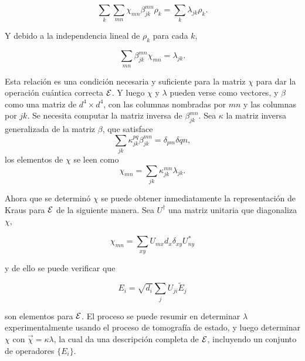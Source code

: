 \begin{equation}
\sum_k \sum_{mn}\chi_{mn}\beta_{jk}^{mn}\rho_k=\sum_k\lambda_{jk}\rho_k.
\end{equation}

Y debido a la independencia lineal de $\rho_k$ para cada $k$,

\begin{equation}
    \sum_{mn}\beta_{jk}^{mn}\chi_{mn}=\lambda_{jk}.
\end{equation}

Esta relación es una condición necesaria y suficiente para la matriz $\chi$ para dar la operación cuántica correcta $\mathcal{E}$. Y luego $\chi$ y $\lambda$ pueden verse como vectores, y $\beta$ como una matriz de $d^4\times d^4$, con las columnas nombradas por ${mn}$ y las columnas por ${jk}$. Se necesita computar la matriz inversa de $\beta_{jk}^{mn}$. Sea $\kappa$ la matriz inversa generalizada de la matriz $\beta$, que satisface \[\sum_{jk}\kappa_{jk}^{pq}\beta_{jk}^{mn}=\delta_{pm}\delta{qn},\] los elementos de $\chi$ se leen como 
\begin{equation}
    \chi_{mn}=\sum_{jk}\kappa_{jk}^{mn}\lambda_{jk}.
\end{equation}

Ahora que se determinó $\chi$ se puede obtener inmediatamente la representación de Kraus para $\mathcal{E}$ de la siguiente manera. Sea $U^\dagger$ una matriz unitaria que diagonaliza $\chi$,

\begin{equation}
    \chi_{mn}=\sum_{xy}U_{mx}d_x\delta_{xy}U_{ny}^*
\end{equation}

y de ello se puede verificar que 

\begin{equation}
    E_i=\sqrt{d_i} \sum_j U_{ji}\tilde{E}_j
\end{equation}


son elementos para $\mathcal{E}$. El proceso se puede resumir en determinar $\lambda$ experimentalmente usando el proceso de tomografía de estado, y luego determinar $\chi$ con $\vec{\chi}=\kappa\lambda$, la cual da una descripción completa de $\mathcal{E}$, incluyendo un conjunto de operadores $\{E_i\}$.








